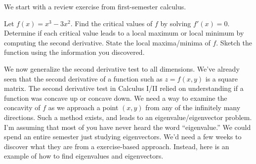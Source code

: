 We start with a review exercise from first-semester calculus.
\begin{problem}
 Let $f(x) = x^3-3x^2$.  Find the critical values of $f$ by solving $f'(x)=0$.  Determine if each critical value leads to a local maximum or local minimum by computing the second derivative. State the local maxima/minima of $f$. Sketch the function using the information you discovered.  
\end{problem}


We now generalize the second derivative test to all dimensions. We've already seen that the second derivative of a function such as $z=f(x,y)$ is a square matrix. The second derivative test in Calculus I/II relied on understanding if a function was concave up or concave down. We need a way to examine the concavity of $f$ as we approach a point $(x,y)$ from any of the infinitely many directions. Such a method exists, and leads to an eigenvalue/eigenvector problem. I'm assuming that most of you have never heard the word ``eigenvalue.'' We could spend an entire semester just studying eigenvectors. We'd need a few weeks to discover what they are from a exercise-based approach.  Instead, here is an example of how to find eigenvalues and eigenvectors.

